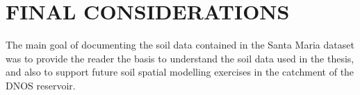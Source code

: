 
\section{FINAL CONSIDERATIONS}

The main goal of documenting the soil data contained in the Santa Maria dataset was to provide the reader the 
basis to understand the soil data used in the thesis, and also to support future soil spatial modelling 
exercises in 
the catchment of the DNOS reservoir.

